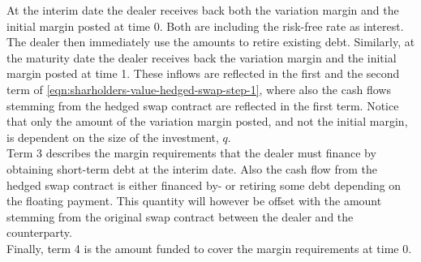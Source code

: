 \documentclass[main.tex]{subfiles}
\begin{document}
        At the interim date the dealer receives back both the variation margin and the initial margin posted at time 0.
        Both are including the risk-free rate as interest.
        The dealer then immediately use the amounts to retire existing debt.
        Similarly, at the maturity date the dealer receives back the variation margin and the initial margin posted at time 1.
        These inflows are reflected in the first and the second term of \cref{eqn:sharholders-value-hedged-swap-step-1},
        where also the cash flows stemming from the hedged swap contract are reflected in the first term.
        Notice that only the amount of the variation margin posted,
        and not the initial margin,
        is dependent on the size of the investment, $q$.
        \\
        Term 3 describes the margin requirements that the dealer must finance by obtaining short-term debt at the interim date.
        Also the cash flow from the hedged swap contract is either financed by- or retiring some debt depending on the floating payment.
        This quantity will however be offset with the amount stemming from the original swap contract between the dealer and the counterparty.
        \\
        Finally, term 4 is the amount funded to cover the margin requirements at time 0.
\end{document}
